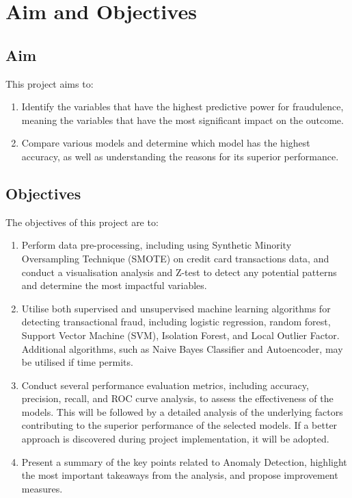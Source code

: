 \section{Aim and Objectives}

\subsection{Aim}
This project aims to:
\begin{enumerate}
  \item Identify the variables that have the highest predictive power for fraudulence, meaning the variables that have the most significant impact on the outcome.
  \item Compare various models and determine which model has the highest accuracy, as well as understanding the reasons for its superior performance.
\end{enumerate}

\subsection{Objectives}
The objectives of this project are to:
\begin{enumerate}
  \item Perform data pre-processing, including using Synthetic Minority Oversampling Technique (SMOTE) on credit card transactions data, and conduct a visualisation analysis and Z-test to detect any potential patterns and determine the most impactful variables.
  \item Utilise both supervised and unsupervised machine learning algorithms for detecting transactional fraud, including logistic regression, random forest, Support Vector Machine (SVM), Isolation Forest, and Local Outlier Factor. Additional algorithms, such as Naive Bayes Classifier and Autoencoder, may be utilised if time permits.
  \item Conduct several performance evaluation metrics, including accuracy, precision, recall, and ROC curve analysis, to assess the effectiveness of the models. This will be followed by a detailed analysis of the underlying factors contributing to the superior performance of the selected models. If a better approach is discovered during project implementation, it will be adopted.
  \item Present a summary of the key points related to Anomaly Detection, highlight the most important takeaways from the analysis, and propose improvement measures.
\end{enumerate}


